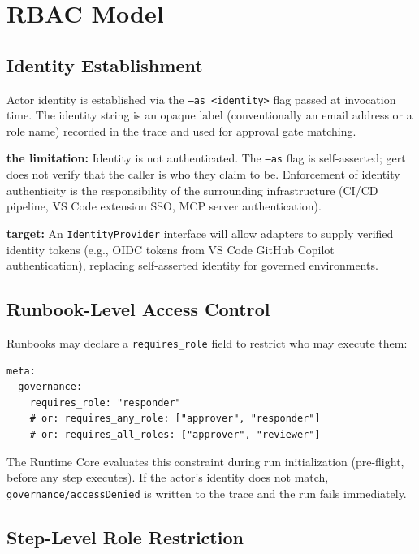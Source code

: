 \section{RBAC Model}

\subsection{Identity Establishment}

Actor identity is established via the \texttt{--as <identity>} flag passed at invocation time.
The identity string is an opaque label (conventionally an email address or a role name) recorded
in the trace and used for approval gate matching.

\textbf{the limitation:} Identity is not authenticated. The \texttt{--as} flag is
self-asserted; gert does not verify that the caller is who they claim to be. Enforcement
of identity authenticity is the responsibility of the surrounding infrastructure (CI/CD
pipeline, VS Code extension SSO, MCP server authentication).

\textbf{target:} An \texttt{IdentityProvider} interface will allow adapters to supply
verified identity tokens (e.g., OIDC tokens from VS Code GitHub Copilot authentication),
replacing self-asserted identity for governed environments.

\subsection{Runbook-Level Access Control}

Runbooks may declare a \texttt{requires\_role} field to restrict who may execute them:

\begin{verbatim}
meta:
  governance:
    requires_role: "responder"
    # or: requires_any_role: ["approver", "responder"]
    # or: requires_all_roles: ["approver", "reviewer"]
\end{verbatim}

The Runtime Core evaluates this constraint during run initialization (pre-flight, before
any step executes). If the actor's identity does not match, \texttt{governance/accessDenied}
is written to the trace and the run fails immediately.

\subsection{Step-Level Role Restriction}

